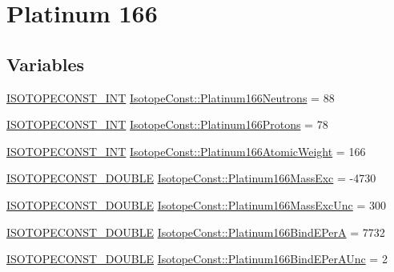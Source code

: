 \hypertarget{group___isotope_const-_platinum-_pt166}{}\section{Platinum 166}
\label{group___isotope_const-_platinum-_pt166}
\subsection*{Variables}
\begin{DoxyCompactItemize}
\item 
\mbox{\hyperlink{group___isotope_const-_macros_ga5f18360b3e99483a35c32d789e62621c}{I\+S\+O\+T\+O\+P\+E\+C\+O\+N\+S\+T\+\_\+\+I\+NT}} \mbox{\hyperlink{group___isotope_const-_platinum-_pt166_gaba62f8a84ff3489403af3b7995565ade}{Isotope\+Const\+::\+Platinum166\+Neutrons}} = 88
\item 
\mbox{\hyperlink{group___isotope_const-_macros_ga5f18360b3e99483a35c32d789e62621c}{I\+S\+O\+T\+O\+P\+E\+C\+O\+N\+S\+T\+\_\+\+I\+NT}} \mbox{\hyperlink{group___isotope_const-_platinum-_pt166_ga44765e957a3a206359ea0cb2b065d16b}{Isotope\+Const\+::\+Platinum166\+Protons}} = 78
\item 
\mbox{\hyperlink{group___isotope_const-_macros_ga5f18360b3e99483a35c32d789e62621c}{I\+S\+O\+T\+O\+P\+E\+C\+O\+N\+S\+T\+\_\+\+I\+NT}} \mbox{\hyperlink{group___isotope_const-_platinum-_pt166_ga64e082e4f77211ade2d60b4bbc89495d}{Isotope\+Const\+::\+Platinum166\+Atomic\+Weight}} = 166
\item 
\mbox{\hyperlink{group___isotope_const-_macros_ga8f45a7272ce02c0b4c65c44636ed719a}{I\+S\+O\+T\+O\+P\+E\+C\+O\+N\+S\+T\+\_\+\+D\+O\+U\+B\+LE}} \mbox{\hyperlink{group___isotope_const-_platinum-_pt166_ga96ec3b037e1ba73668fcf32f7b93413b}{Isotope\+Const\+::\+Platinum166\+Mass\+Exc}} = -\/4730
\item 
\mbox{\hyperlink{group___isotope_const-_macros_ga8f45a7272ce02c0b4c65c44636ed719a}{I\+S\+O\+T\+O\+P\+E\+C\+O\+N\+S\+T\+\_\+\+D\+O\+U\+B\+LE}} \mbox{\hyperlink{group___isotope_const-_platinum-_pt166_ga7d464f1f7caa1daeb436c13c325766d9}{Isotope\+Const\+::\+Platinum166\+Mass\+Exc\+Unc}} = 300
\item 
\mbox{\hyperlink{group___isotope_const-_macros_ga8f45a7272ce02c0b4c65c44636ed719a}{I\+S\+O\+T\+O\+P\+E\+C\+O\+N\+S\+T\+\_\+\+D\+O\+U\+B\+LE}} \mbox{\hyperlink{group___isotope_const-_platinum-_pt166_ga71f6eebc235680fde8ce1ee5b7608320}{Isotope\+Const\+::\+Platinum166\+Bind\+E\+PerA}} = 7732
\item 
\mbox{\hyperlink{group___isotope_const-_macros_ga8f45a7272ce02c0b4c65c44636ed719a}{I\+S\+O\+T\+O\+P\+E\+C\+O\+N\+S\+T\+\_\+\+D\+O\+U\+B\+LE}} \mbox{\hyperlink{group___isotope_const-_platinum-_pt166_ga96fb1cf7eb0309a236cf06a56e796c9f}{Isotope\+Const\+::\+Platinum166\+Bind\+E\+Per\+A\+Unc}} = 2

\end{DoxyCompactItemize}
